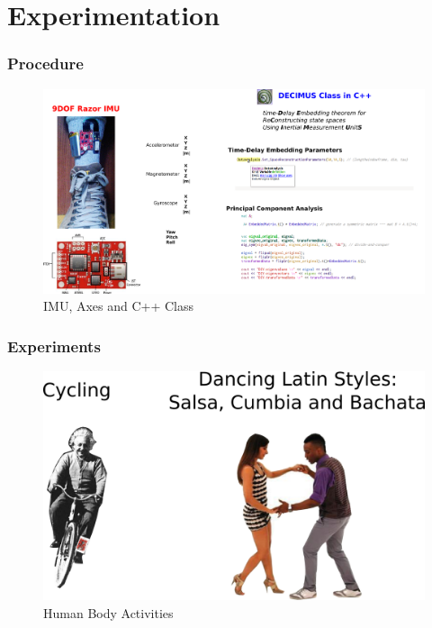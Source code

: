 \documentclass{beamer}
\theoremstyle{definition}
\begin{document}
\section{Experimentation}

\begin{frame}
\frametitle{Procedure}

\begin{figure}
\includegraphics[scale=0.2]{procedure}
\caption{IMU, Axes and C++ Class}
\end{figure}  
\end{frame}


\begin{frame}
\frametitle{Experiments}

\vspace{-5mm}
\begin{figure}
\includegraphics[scale=0.23]{humanbodyactivities}
\vspace{-3mm}
\caption{Human Body Activities}
\end{figure}  
\end{frame}
\end{document}
